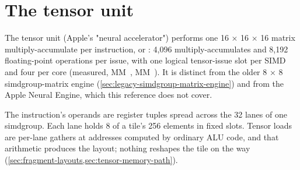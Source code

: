 \chapter{The tensor unit}\label{ch:tensor-unit}

The tensor unit (Apple's "neural accelerator") performs one 16 × 16 × 16 matrix multiply-accumulate
per instruction,  or : 4,096 multiply-accumulates and 8,192 floating-point operations per issue,
with one logical tensor-issue slot per SIMD and four per core (measured, MM~, MM~). It is distinct from the older 8 × 8 simdgroup-matrix engine (\cref{sec:legacy-simdgroup-matrix-engine}) and from the Apple Neural
Engine, which this reference does not cover.

The instruction's operands are register tuples spread across the 32 lanes of one simdgroup. Each lane holds 8 of a
tile's 256 elements in fixed slots. Tensor loads are per-lane gathers at addresses computed by ordinary ALU code, and
that arithmetic produces the layout; nothing reshapes the tile on the way (\cref{sec:fragment-layouts,sec:tensor-memory-path}).


